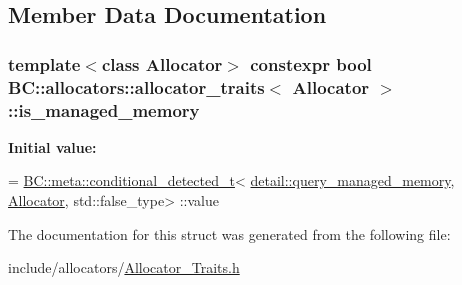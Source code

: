\subsection{Member Data Documentation}
\subsubsection[{\texorpdfstring{is\+\_\+managed\+\_\+memory}{is_managed_memory}}]{\setlength{\rightskip}{0pt plus 5cm}template$<$class Allocator$>$ constexpr bool {\bf B\+C\+::allocators\+::allocator\+\_\+traits}$<$ {\bf Allocator} $>$\+::is\+\_\+managed\+\_\+memory\hspace{0.3cm}{\ttfamily [static]}}\hypertarget{structBC_1_1allocators_1_1allocator__traits_a6c6c9f87486c91b1404f8ff01328641c}{}\label{structBC_1_1allocators_1_1allocator__traits_a6c6c9f87486c91b1404f8ff01328641c}
{\bfseries Initial value\+:}
\begin{DoxyCode}
=
            \hyperlink{namespaceBC_1_1meta_a96ed28f49a8ffe8f0bae28da99e6ee18}{BC::meta::conditional\_detected\_t}<
            \hyperlink{namespaceBC_1_1allocators_1_1detail_ad4bb4e071d1562e0209c47f8ebf8eade}{detail::query\_managed\_memory}, \hyperlink{namespaceBC_a934f94b17b06290e6b241e5f59930c5f}{Allocator}, std::false\_type>
      ::value
\end{DoxyCode}


The documentation for this struct was generated from the following file\+:\begin{DoxyCompactItemize}
\item 
include/allocators/\hyperlink{Allocator__Traits_8h}{Allocator\+\_\+\+Traits.\+h}\end{DoxyCompactItemize}
